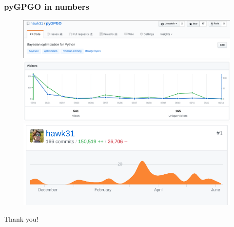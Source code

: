 \documentclass[10pt]{beamer}
\begin{document}
\begin{frame}
\frametitle{pyGPGO in numbers}
\begin{figure}
\includegraphics[width=\textwidth]{figures/pygpgo_git}\\
\includegraphics[width=\textwidth]{figures/visits}\\
\includegraphics[scale=0.3]{figures/commits}
\end{figure}
\end{frame}

\begin{frame}[plain,c]
\begin{center}
\Huge Thank you!
\end{center}
\end{frame}
			
			
\end{document}
